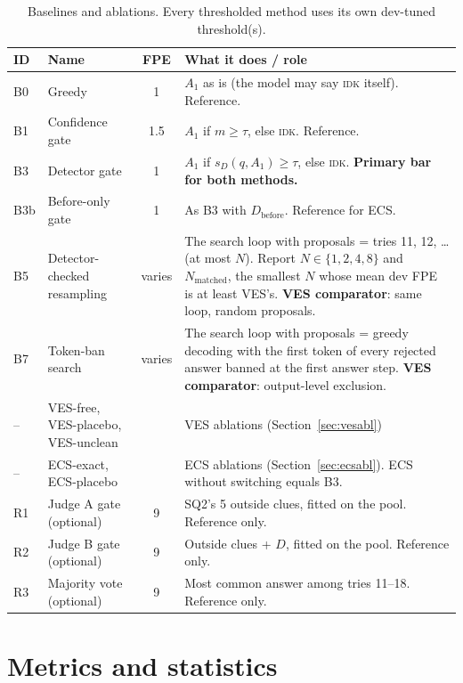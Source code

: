 \documentclass[11pt]{article}
\newcommand{\IDK}{\textsc{idk}}
\newcommand{\sD}{s_{D}}
\begin{document}
\begin{table}[H]
\centering
\small
\begin{tabularx}{\textwidth}{@{}llcL@{}}
\toprule
ID & Name & FPE & What it does / role \\
\midrule
B0 & Greedy & 1 & $A_1$ as is (the model may say \IDK{} itself). Reference. \\
B1 & Confidence gate & 1.5 & $A_1$ if $m \ge \tau$, else \IDK. Reference. \\
B3 & Detector gate & 1 & $A_1$ if $\sD(q, A_1) \ge \tau$, else \IDK. \textbf{Primary bar for both methods.} \\
B3b & Before-only gate & 1 & As B3 with $D_{\mathrm{before}}$. Reference for ECS. \\
B5 & Detector-checked resampling & varies & The search loop with proposals = tries 11, 12, \dots{}
     (at most $N$). Report $N \in \{1, 2, 4, 8\}$ and $N_{\mathrm{matched}}$, the smallest $N$ whose mean
     dev FPE is at least VES's. \textbf{VES comparator}: same loop, random proposals. \\
B7 & Token-ban search & varies & The search loop with proposals = greedy decoding with the first token of every
     rejected answer banned at the first answer step. \textbf{VES comparator}: output-level exclusion. \\
\midrule
-- & VES-free, VES-placebo, VES-unclean & & VES ablations (Section~\ref{sec:vesabl}) \\
-- & ECS-exact, ECS-placebo & & ECS ablations (Section~\ref{sec:ecsabl}). ECS without switching equals B3. \\
\midrule
R1 & Judge A gate (optional) & 9 & SQ2's 5 outside clues, fitted on the pool. Reference only. \\
R2 & Judge B gate (optional) & 9 & Outside clues + $D$, fitted on the pool. Reference only. \\
R3 & Majority vote (optional) & 9 & Most common answer among tries 11--18. Reference only. \\
\bottomrule
\end{tabularx}
\caption{Baselines and ablations. Every thresholded method uses its own dev-tuned threshold(s).}
\end{table}

\section{Metrics and statistics}
\end{document}
